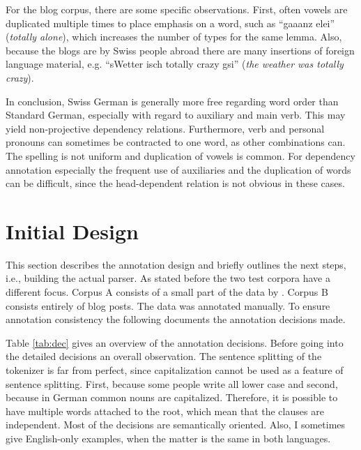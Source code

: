 \documentclass[11pt,letterpaper, covington]{article}
\begin{document}
For the blog corpus, there are some specific observations. First, often vowels are duplicated multiple times to place emphasis on a word, such as ``gaaanz elei'' (\emph{totally alone}), which increases the number of types for the same lemma. Also, because the blogs are by Swiss people abroad there are many insertions of foreign language material, e.g. ``sWetter isch totally crazy gsi'' (\emph{the weather was totally crazy}).

In conclusion, Swiss German is generally more free regarding word order than Standard German, especially with regard to auxiliary and main verb. This may yield non-projective dependency relations. Furthermore, verb and personal pronouns can sometimes be contracted to one word, as other combinations can. The spelling is not uniform and duplication of vowels is common. For dependency annotation especially the frequent use of auxiliaries and the duplication of words can be difficult, since the head-dependent relation is not obvious in these cases.


\section{Initial Design}

This section describes the annotation design and briefly outlines the next steps, i.e., building the actual parser. As stated before the two test corpora have a different focus. Corpus A consists of a small part of the data by \citet{AH12}. Corpus B consists entirely of blog posts. The data was annotated manually. To ensure annotation consistency the following documents the annotation decisions made.

Table \ref{tab:dec} gives an overview of the annotation decisions. Before going into the detailed decisions an overall observation. The sentence splitting of the tokenizer is far from perfect, since capitalization cannot be used as a feature of sentence splitting. First, because some people write all lower case and second, because in German common nouns are capitalized. Therefore, it is possible to have multiple words attached to the root, which mean that the clauses are independent. Most of the decisions are semantically oriented. Also, I sometimes give English-only examples, when the matter is the same in both languages.
\end{document}
